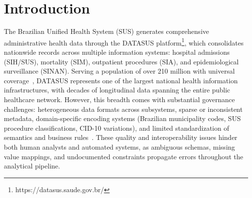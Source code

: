 \documentclass[sigconf,natbib=false]{acmart}
\begin{document}




\maketitle

\section{Introduction}



The Brazilian Unified Health System (SUS) generates comprehensive administrative health data through the DATASUS platform\footnote{https://datasus.saude.gov.br/}, which consolidates nationwide records across multiple information systems: hospital admissions (SIH/SUS), mortality (SIM), outpatient procedures (SIA), and epidemiological surveillance (SINAN). Serving a population of over 210 million with universal coverage~\cite{datasus_site}, DATASUS represents one of the largest national health information infrastructures, with decades of longitudinal data spanning the entire public healthcare network. However, this breadth comes with substantial governance challenges: heterogeneous data formats across subsystems, sparse or inconsistent metadata, domain-specific encoding systems (Brazilian municipality codes, SUS procedure classifications, CID-10 variations), and limited standardization of semantics and business rules~\cite{viana2023datasus}. These quality and interoperability issues hinder both human analysts and automated systems, as ambiguous schemas, missing value mappings, and undocumented constraints propagate errors throughout the analytical pipeline.
\end{document}
